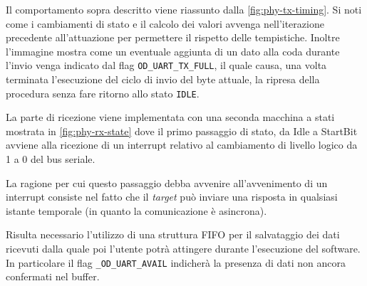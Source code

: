 Il comportamento sopra descritto viene riassunto dalla \cref{fig:phy-tx-timing}. Si noti come i cambiamenti di stato e il calcolo dei valori avvenga nell'iterazione precedente all'attuazione per permettere il rispetto delle tempistiche.
Inoltre l'immagine mostra come un eventuale aggiunta di un dato alla coda durante l'invio venga indicato dal flag \texttt{OD\_UART\_TX\_FULL}, il quale causa, una volta terminata l'esecuzione del ciclo di invio del byte attuale, la ripresa della procedura senza fare ritorno allo stato \texttt{IDLE}.

\begin{figure}[p]
    \checkoddpage%
    \ifoddpage%
    \else
    \fi
\end{figure}


La parte di ricezione viene implementata con una seconda macchina a stati mostrata in \cref{fig:phy-rx-state} dove il primo passaggio di stato, da Idle a StartBit avviene alla ricezione di un interrupt relativo al cambiamento di livello logico da 1 a 0 del bus seriale.

La ragione per cui questo passaggio debba avvenire all'avvenimento di un interrupt consiste nel fatto che il \textit{target} può inviare una risposta in qualsiasi istante temporale (in quanto la comunicazione è asincrona).

Risulta necessario l'utilizzo di una struttura FIFO per il salvataggio dei dati ricevuti dalla quale poi l'utente potrà attingere durante l'esecuzione del software. In particolare il flag \texttt{\_OD\_UART\_AVAIL} indicherà la presenza di dati non ancora confermati nel buffer.

